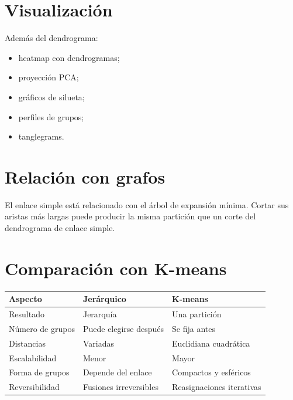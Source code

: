 \documentclass[
  spanish,
  10.5pt,
  letterpaper,
  DIV=11,
  numbers=noendperiod,
  oneside,
  open=any]{scrreprt}
\newcounter{none} %
\providecommand{\tightlist}{%
  \setlength{\itemsep}{0pt}\setlength{\parskip}{0pt}}
\theoremstyle{definition}
\theoremstyle{definition}
\theoremstyle{plain}
\theoremstyle{remark}
\begin{document}
\section*{Visualización}\label{visualizaciuxf3n}


Además del dendrograma:

\begin{itemize}
\tightlist
\item
  heatmap con dendrogramas;
\item
  proyección PCA;
\item
  gráficos de silueta;
\item
  perfiles de grupos;
\item
  tanglegrams.
\end{itemize}

\section*{Relación con grafos}\label{relaciuxf3n-con-grafos}


El enlace simple está relacionado con el árbol de expansión mínima.
Cortar sus aristas más largas puede producir la misma partición que un
corte del dendrograma de enlace simple.

\section*{Comparación con K-means}\label{comparaciuxf3n-con-k-means}


{\def\LTcaptype{none} %
\begin{longtable}[]{@{}lll@{}}
\toprule\noalign{}
Aspecto & Jerárquico & K-means \\
\midrule\noalign{}
\endhead
\bottomrule\noalign{}
\endlastfoot
Resultado & Jerarquía & Una partición \\
Número de grupos & Puede elegirse después & Se fija antes \\
Distancias & Variadas & Euclidiana cuadrática \\
Escalabilidad & Menor & Mayor \\
Forma de grupos & Depende del enlace & Compactos y esféricos \\
Reversibilidad & Fusiones irreversibles & Reasignaciones iterativas \\
\end{longtable}
}
\end{document}
